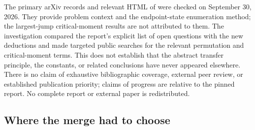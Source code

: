 \documentclass[11pt,a4paper]{article}
\theoremstyle{definition}\newaliascnt{definition}{theorem}
\theoremstyle{remark}\newaliascnt{remark}{theorem}
\begin{document}
The primary arXiv records and relevant HTML of \cite{Nadler,MayamaAkita}
were checked on September 30, 2026. They provide problem context and the
endpoint-state enumeration method; the largest-jump critical-moment results
are not attributed to them. The investigation compared the report's explicit
list of open questions with the new deductions and made targeted public
searches for the relevant permutation and critical-moment terms. This does
not establish that the abstract transfer principle, the constants, or related
conclusions have never appeared elsewhere. There is no claim of exhaustive
bibliographic coverage, external peer review, or established publication
priority; claims of progress are relative to the pinned report. No complete
report or external paper is redistributed.

\subsection{Where the merge had to choose}
\label{cjm:sec:merge}
\end{document}
